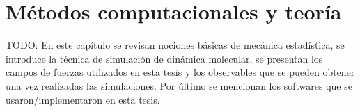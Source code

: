 \chapter{Métodos computacionales y teoría}\label{ch:metodos}
\thispagestyle{empty}

\vspace{50pt}

\begin{adjustwidth}{50pt}{50pt}
    TODO: 
    En este capítulo se revisan nociones básicas de mecánica estadística, se 
    introduce la técnica de simulación de dinámica molecular, se presentan los 
    campos de fuerzas utilizados en esta tesis y los observables que se pueden 
    obtener una vez realizadas las simulaciones. Por último se mencionan los 
    softwares que se usaron/implementaron en esta tesis.
\end{adjustwidth}

\clearpage
\newpage
\thispagestyle{empty}
\mbox{}
\newpage














